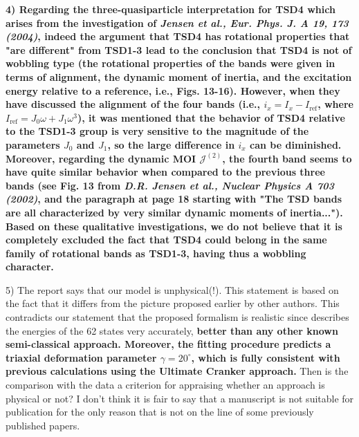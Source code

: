 \documentclass[11pt,a4paper]{article}
\begin{document}
\textbf{
4) Regarding the three-quasiparticle interpretation for TSD4 which arises from the investigation of \emph{Jensen et al., Eur. Phys. J. A 19, 173 (2004)}, indeed the argument that TSD4 has rotational properties that "are different" from TSD1-3 lead to the conclusion that TSD4 is not of wobbling type (the rotational properties of the bands were given in terms of alignment, the dynamic moment of inertia, and the excitation energy relative to a reference, i.e., Figs. 13-16). However, when they have discussed the alignment of the four bands (i.e., $i_x=I_x-I_\text{ref}$, where $I_\text{ref}=J_0\omega+J_1\omega^3$), it was mentioned that the behavior of TSD4 relative to the TSD1-3 group is very sensitive to the magnitude of the parameters $J_0$ and $J_1$, so the large difference in $i_x$ can be diminished. Moreover, regarding the dynamic MOI $\mathcal{J}^{(2)}$, the fourth band seems to have quite similar behavior when compared to the previous three bands (see Fig. 13 from \emph{D.R. Jensen et al., Nuclear Physics A 703 (2002)}, and the paragraph at page 18 starting with "The TSD bands are all characterized by very similar dynamic moments of inertia..."). Based on these qualitative investigations, we do not believe that it is completely excluded the fact that TSD4 could belong in the same family of rotational bands as TSD1-3, having thus a wobbling character.}

5) The report says that our model is unphysical(!). This statement is based on the fact that it differs from the picture proposed earlier by other authors. This contradicts our statement that the proposed formalism is realistic since describes the energies of the 62 states very accurately, \textbf{better than any other known semi-classical approach. Moreover, the fitting procedure predicts a triaxial deformation parameter $\gamma=20^\circ$, which is fully consistent with previous calculations using the Ultimate Cranker approach.} Then is the comparison with the data a criterion for appraising whether an approach is physical or not? I don’t think it is fair to say that a manuscript is not suitable for publication for the only reason that is not on the line of some previously published papers.
\end{document}
